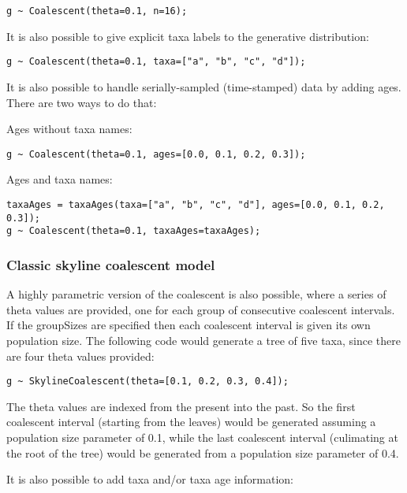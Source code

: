 \documentclass[oneside]{article}
\begin{document}
\begin{verbatim}
g ~ Coalescent(theta=0.1, n=16);
\end{verbatim}

It is also possible to give explicit taxa labels to the generative
distribution: 

\begin{verbatim}
g ~ Coalescent(theta=0.1, taxa=["a", "b", "c", "d"]);
\end{verbatim}

It is also possible to handle serially-sampled (time-stamped) data by
adding ages.
There are two ways to do that: 

Ages without taxa names:

\begin{verbatim}
g ~ Coalescent(theta=0.1, ages=[0.0, 0.1, 0.2, 0.3]);
\end{verbatim}

Ages and taxa names:

\begin{verbatim}
taxaAges = taxaAges(taxa=["a", "b", "c", "d"], ages=[0.0, 0.1, 0.2,
0.3]);
g ~ Coalescent(theta=0.1, taxaAges=taxaAges);
\end{verbatim}

\subsubsection{Classic skyline coalescent model}

A highly parametric version of the coalescent is also possible, where
a series of theta values are provided, one for each group of consecutive coalescent intervals.
If the groupSizes are specified then each coalescent interval is given its
own population size.
The following code would generate a tree of five taxa, since there are four theta values provided:

\begin{verbatim}
g ~ SkylineCoalescent(theta=[0.1, 0.2, 0.3, 0.4]);
\end{verbatim}

The theta values are indexed from the present into the past.
So the first coalescent interval (starting from the leaves)
would be generated assuming a population size parameter of 0.1, while
the last coalescent interval (culimating at the root of the tree)
would be generated from a population size parameter of 0.4.

It is also possible to add taxa and/or taxa age information:
\end{document}
